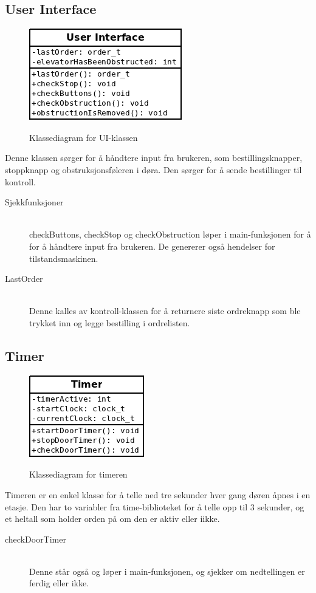 \subsection{User Interface}
\begin{figure}
\centering
\includegraphics[scale=0.6]{ui.png}
\label{klasse:ui}
\caption{Klassediagram for UI-klassen}
\end{figure}
Denne klassen sørger for å håndtere input fra brukeren, som bestillingsknapper, stoppknapp og obstruksjonsføleren i døra. Den sørger for å sende bestillinger til kontroll.
\begin{description}
\item[Sjekkfunksjoner]\hfill \\
checkButtons, checkStop og checkObstruction løper i main-funksjonen for å for å håndtere input fra brukeren. De genererer også hendelser for tilstandsmaskinen.
\item[LastOrder]\hfill \\
Denne kalles av kontroll-klassen for å returnere siste ordreknapp som ble trykket inn og legge bestilling i ordrelisten.
\end{description}
\subsection{Timer}
\begin{figure}
\centering
\includegraphics[scale=0.6]{timer.png}
\label{klasse:timer}
\caption{Klassediagram for timeren}
\end{figure}
Timeren er en enkel klasse for å telle ned tre sekunder hver gang døren åpnes i en etasje. Den har to variabler fra time-biblioteket for å telle opp til 3 sekunder, og et heltall som holder orden på om den er aktiv eller iikke.
\begin{description}
\item[checkDoorTimer]\hfill \\
Denne står også og løper i main-funksjonen, og sjekker om nedtellingen er ferdig eller ikke.
\end{description}
